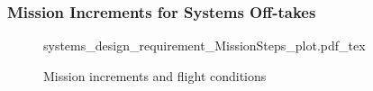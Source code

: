 
\begin{frame}
 \frametitle{Mission Increments for Systems Off-takes}
     \begin{figure}
     \tiny
     \def\svgwidth{7cm}
     {systems_design_requirement_MissionSteps_plot.pdf_tex}
         \caption{\scriptsize{Mission increments and flight conditions}}
     \end{figure}
\end{frame}

